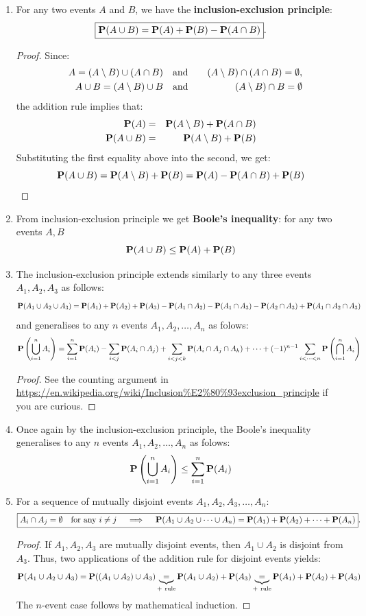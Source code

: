\begin{enumerate}
\item For any two events $A$ and $B$, we have the {\bf inclusion-exclusion principle}:
\[
\boxed{
\mathbf{P}(A \cup B) = \mathbf{P}(A) + \mathbf{P}(B) - \mathbf{P}(A \cap B)
}.
\]
{\scriptsize
\begin{proof}
Since: 
\begin{eqnarray}
\quad A = (A \setminus B) \cup (A \cap B) & \quad \text{and} \quad & (A \setminus B) \cap (A \cap B) = \emptyset, \notag \\
\quad A \cup B = (A \setminus B) \cup B & \quad \text{and} \quad & (A \setminus B) \cap B = \emptyset \notag
\end{eqnarray}
the addition rule implies that:
\begin{eqnarray}
\mathbf{P}(A) &=& \mathbf{P}(A \setminus B) + \mathbf{P}(A \cap B) \notag \\
\mathbf{P}(A \cup B) &=& \mathbf{P}(A \setminus B) + \mathbf{P}(B) \notag
\end{eqnarray}
Substituting the first equality above into the second, we get:
\[
\mathbf{P}(A \cup B) = \mathbf{P}(A \setminus B) + \mathbf{P}(B) = \mathbf{P}(A) - \mathbf{P}(A \cap B) + \mathbf{P}(B)
\]
\end{proof}
}
\item From inclusion-exclusion principle we get {\bf Boole's inequality}: for any two events $A, B$
\[
\mathbf{P}(A \cup B) \leq \mathbf{P}(A) + \mathbf{P}(B)
\]
\item The inclusion-exclusion principle extends similarly to any three events $A_1,A_2,A_3$ as follows:
\[
\mathbf{P}(A_1 \cup A_2 \cup A_3) = \mathbf{P}(A_1) + \mathbf{P}(A_2) + \mathbf{P}(A_3) - \mathbf{P}(A_1 \cap A_2) - \mathbf{P}(A_1 \cap A_3) - \mathbf{P}(A_2 \cap A_3) + \mathbf{P}(A_1 \cap A_2 \cap A_3)
\]
and generalises to any $n$ events $A_1,A_2,\ldots,A_n$ as folows:
\[
\mathbf{P} \left( \bigcup_{i=1}^n A_i \right) = \sum_{i=1}^n \mathbf{P}(A_i) - \sum_{i<j} \mathbf{P}(A_i \cap A_j) + \sum_{i<j<k} \mathbf{P}(A_i \cap A_j \cap A_k) + \cdots + (-1)^{n-1} \sum_{i< \cdots <n} \mathbf{P} \left( \bigcap_{i=1}^n A_i \right)
\]

{\scriptsize
\begin{proof} See the counting argument in \url{https://en.wikipedia.org/wiki/Inclusion\%E2\%80\%93exclusion_principle} if you are curious.
\end{proof}
}  
\item Once again by the inclusion-exclusion principle, the Boole's inequality generalises to any $n$ events $A_1,A_2,\ldots,A_n$ as folows:
\[
\mathbf{P} \left( \bigcup_{i=1}^n A_i \right) \leq \sum_{i=1}^n \mathbf{P}(A_i)
\]
\item For a sequence of mutually disjoint events $A_1, A_2, A_3, \ldots, A_n$: 
\[
\boxed{
A_i \cap A_j = \emptyset \quad \text{for any $i \neq j$} \quad \implies \quad \mathbf{P}(A_1 \cup A_2 \cup \cdots \cup A_n) = \mathbf{P}(A_1)+\mathbf{P}(A_2)+ \cdots + \mathbf{P}(A_n)} .
\]
{\scriptsize
\begin{proof}
If $A_1, A_2, A_3$ are mutually disjoint events, then $A_1 \cup A_2$ is disjoint from $A_3$.  Thus, two applications of the addition rule for disjoint events yields:
\[
\mathbf{P}(A_1 \cup A_2 \cup A_3) = \mathbf{P}((A_1 \cup A_2) \cup A_3) \underbrace{=}_{+~\text{rule}} \mathbf{P}(A_1 \cup A_2) + \mathbf{P}(A_3) \underbrace{=}_{+~\text{rule}}  \mathbf{P}(A_1) + \mathbf{P}(A_2) + \mathbf{P}(A_3)
\]
The $n$-event case follows by mathematical induction.
\end{proof}
}
\end{enumerate}

